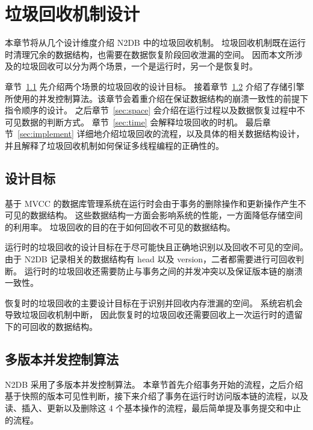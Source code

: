 
\chapter{垃圾回收机制设计}

本章节将从几个设计维度介绍 N2DB 中的垃圾回收机制。
垃圾回收机制既在运行时清理冗余的数据结构，也需要在数据恢复阶段回收泄漏的空间。
因而本文所涉及的垃圾回收可以分为两个场景，一个是运行时，另一个是恢复时。

章节~\ref{sec:gc-goal} 先介绍两个场景的垃圾回收的设计目标。
接着章节~\ref{sec:mvcc} 介绍了存储引擎所使用的并发控制算法。该章节会着重介绍在保证数据结构的崩溃一致性的前提下指令顺序的设计。
之后章节~\ref{sec:space} 会介绍在运行过程以及数据恢复过程中不可见数据的判断方式。
章节~\ref{sec:time} 会解释垃圾回收的时机。
最后章节~\ref{sec:implement} 详细地介绍垃圾回收的流程，以及具体的相关数据结构设计，并且解释了垃圾回收机制如何保证多线程编程的正确性的。


\section{设计目标}
\label{sec:gc-goal}

基于 MVCC 的数据库管理系统在运行时会由于事务的删除操作和更新操作产生不可见的数据结构。
这些数据结构一方面会影响系统的性能，一方面降低存储空间的利用率。
垃圾回收的目的在于如何回收不可见的数据结构。

运行时的垃圾回收的设计目标在于尽可能快且正确地识别以及回收不可见的空间。
由于 N2DB 记录相关的数据结构有 head 以及 version，二者都需要进行可回收判断。
运行时的垃圾回收还需要防止与事务之间的并发冲突以及保证版本链的崩溃一致性。

恢复时的垃圾回收的主要设计目标在于识别并回收内存泄漏的空间。
系统宕机会导致垃圾回收机制中断，
因此恢复时的垃圾回收还需要回收上一次运行时的遗留下的可回收的数据结构。


\section{多版本并发控制算法}
\label{sec:mvcc}
N2DB 采用了多版本并发控制算法。
本章节首先介绍事务开始的流程，之后介绍基于快照的版本可见性判断，接下来介绍了事务在运行时访问版本链的流程，以及读、插入、更新以及删除这 4 个基本操作的流程，最后简单提及事务提交和中止的流程。

